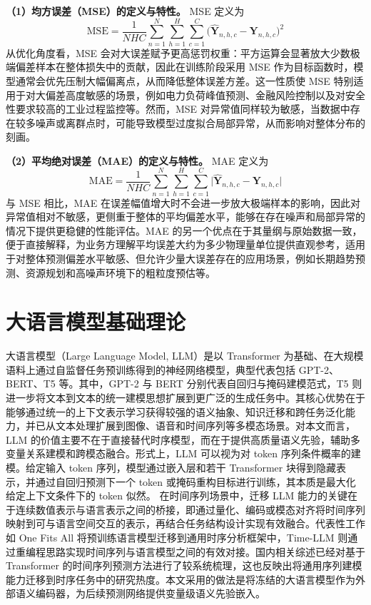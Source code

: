 \textbf{（1）均方误差（MSE）的定义与特性。} MSE 定义为 \begin{equation}
\mathrm{MSE} = \frac{1}{NHC}\sum_{n=1}^{N}\sum_{h=1}^{H}\sum_{c=1}^{C}\bigl(\hat{\mathbf{Y}}_{n,h,c}-\mathbf{Y}_{n,h,c}\bigr)^2
\label{eq:chap2-07}
\end{equation}
从优化角度看，MSE 会对大误差赋予更高惩罚权重：平方运算会显著放大少数极端偏差样本在整体损失中的贡献，因此在训练阶段采用 MSE 作为目标函数时，模型通常会优先压制大幅偏离点，从而降低整体误差方差。这一性质使 MSE 特别适用于对大偏差高度敏感的场景，例如电力负荷峰值预测、金融风险控制以及对安全性要求较高的工业过程监控等。然而，MSE 对异常值同样较为敏感，当数据中存在较多噪声或离群点时，可能导致模型过度拟合局部异常，从而影响对整体分布的刻画。

\textbf{（2）平均绝对误差（MAE）的定义与特性。} MAE 定义为 \begin{equation}
\mathrm{MAE} = \frac{1}{NHC}\sum_{n=1}^{N}\sum_{h=1}^{H}\sum_{c=1}^{C}\bigl|\hat{\mathbf{Y}}_{n,h,c}-\mathbf{Y}_{n,h,c}\bigr|
\label{eq:chap2-08}
\end{equation}
与 MSE 相比，MAE 在误差幅值增大时不会进一步放大极端样本的影响，因此对异常值相对不敏感，更侧重于整体的平均偏差水平，能够在存在噪声和局部异常的情况下提供更稳健的性能评估。MAE 的另一个优点在于其量纲与原始数据一致，便于直接解释，为业务方理解平均误差大约为多少物理量单位提供直观参考，适用于对整体预测偏差水平敏感、但允许少量大误差存在的应用场景，例如长期趋势预测、资源规划和高噪声环境下的粗粒度预估等。

\section{大语言模型基础理论}
大语言模型（Large Language Model, LLM）是以 Transformer 为基础、在大规模语料上通过自监督任务预训练得到的神经网络模型，典型代表包括 GPT-2、BERT、T5 等。其中，GPT-2 与 BERT 分别代表自回归与掩码建模范式\cite{radford2019language,devlin2019bert}，T5 则进一步将文本到文本的统一建模思想扩展到更广泛的生成任务中\cite{raffel2020exploring}。其核心优势在于能够通过统一的上下文表示学习获得较强的语义抽象、知识迁移和跨任务泛化能力，并已从文本处理扩展到图像、语音和时间序列等多模态场景。对本文而言，LLM 的价值主要不在于直接替代时序模型，而在于提供高质量语义先验，辅助多变量关系建模和跨模态融合。形式上，LLM 可以视为对 token 序列条件概率的建模。给定输入 token 序列，模型通过嵌入层和若干 Transformer 块得到隐藏表示，并通过自回归预测下一个 token 或掩码重构目标进行训练，其本质是最大化给定上下文条件下的 token 似然。
在时间序列场景中，迁移 LLM 能力的关键在于连续数值表示与语言表示之间的桥接，即通过量化、编码或模态对齐将时间序列映射到可与语言空间交互的表示，再结合任务结构设计实现有效融合。代表性工作如 One Fits All 将预训练语言模型迁移到通用时序分析框架中，Time-LLM 则通过重编程思路实现时间序列与语言模型之间的有效对接。国内相关综述已经对基于 Transformer 的时间序列预测方法进行了较系统梳理，这也反映出将通用序列建模能力迁移到时序任务中的研究热度。本文采用的做法是将冻结的大语言模型作为外部语义编码器，为后续预测网络提供变量级语义先验嵌入。
